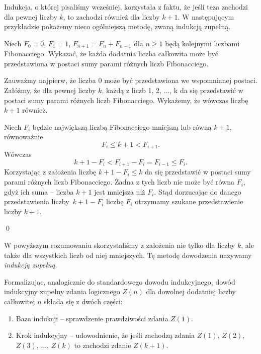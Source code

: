 


\noindent
Indukcja, o której pisaliśmy wcześniej, korzystała z faktu, że jeśli teza zachodzi dla pewnej liczby $k$, to zachodzi również dla liczby $k + 1$. W następującym przykładzie pokażemy nieco ogólniejszą metodę, zwaną indukcją zupełną.

\vspace{10px}


\noindent
Niech $F_0 = 0$, $F_1 = 1$, $F_{n + 1} = F_n + F_{n - 1}$ dla $n \geqslant 1$ będą kolejnymi liczbami Fibonacciego. Wykazać, że każda dodatnia liczba całkowita może być przedstawiona w postaci sumy parami różnych liczb Fibonacciego.

\vspace{10px}


\noindent
Zauważmy najpierw, że liczba $0$ może być przedstawiona we wspomnianej postaci.
Załóżmy, że dla pewnej liczby $k$, każdą z liczb 1, 2, ..., k da się przedstawić w postaci sumy parami różnych liczb Fibonacciego. Wykażemy, że wówczas liczbę $k + 1$ również.

\vspace{10px}

\noindent
Niech $F_i$ będzie największą liczbą Fibonacciego mniejszą lub równą $k + 1$, równoważnie
\[
	F_i \leqslant k + 1 < F_{i + 1}.
\]
Wówczas
\[
	k + 1 - F_i < F_{i + 1} -  F_{i} = F_{i - 1} \leqslant F_{i}.
\]
Korzystając z założenia liczbę $k + 1 - F_i \leqslant k$ da się przedstawić w postaci sumy parami różnych liczb Fibonacciego. Żadna z tych liczb nie może być równa $F_{i}$, gdyż ich suma -- liczba $k + 1$ jest mniejsza niż $F_i$. Stąd dorzucając do danego przedstawienia liczby~$k + 1 - F_i$  liczbę $F_{i}$ otrzymamy szukane przedstawienie liczby $k + 1$.

\qed

\noindent



\noindent
W powyższym rozumowaniu skorzystaliśmy z założenia nie tylko dla liczby $k$, ale także dla wszystkich liczb od niej mniejszych. Tę metodę dowodzenia  nazywamy \textit{indukcją zupełną}. 

\vspace{10px}

\noindent
Formalizując, analogicznie do standardowego dowodu indukcyjnego, dowód indukcyjny zupełny zdania logicznego $Z(n)$ dla dowolnej dodatniej liczby całkowitej $n$ składa się z dwóch części:
\begin{enumerate}
	\item Baza indukcji -- sprawdzenie prawdziwości zdania $Z(1)$.
	\item Krok indukcyjny -- udowodnienie, że jeśli zachodzą zdania $Z(1)$, $Z(2)$, $Z(3)$, ..., $Z(k)$ to zachodzi zdanie $Z(k + 1)$.
\end{enumerate}

